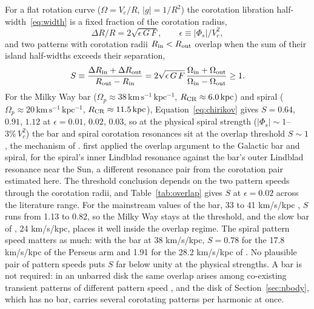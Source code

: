 \documentclass[twocolumn]{aastex701}
\newcommand{\kpc}{\,\mathrm{kpc}}
\begin{document}
For a flat rotation curve ($\Omega=V_c/R$, $|g|=1/R^2$) the corotation libration
half-width~\eqref{eq:width} is a fixed fraction of the corotation radius,
%
\begin{equation}
  \Delta R / R = 2\sqrt{\epsilon\,G\,F},
  \qquad \epsilon \equiv |\Phi_s|/V_c^2 ,
\end{equation}
%
and two patterns with corotation radii $R_{\rm in}<R_{\rm out}$ overlap when the sum
of their island half-widths exceeds their separation,
%
\begin{equation}
  S \equiv \frac{\Delta R_{\rm in}+\Delta R_{\rm out}}{R_{\rm out}-R_{\rm in}}
  = 2\sqrt{\epsilon\,G\,F}\,\frac{\Omega_{\rm in}+\Omega_{\rm out}}
                                  {\Omega_{\rm in}-\Omega_{\rm out}} \ge 1 .
  \label{eq:chirikov}
\end{equation}
%
For the Milky Way bar ($\Omega_p\approx38\,\mathrm{km\,s^{-1}\,kpc^{-1}}$,
$R_{\rm CR}\approx6.0\kpc$) and spiral
($\Omega_p\approx20\,\mathrm{km\,s^{-1}\,kpc^{-1}}$, $R_{\rm CR}\approx11.5\kpc$),
Equation~\eqref{eq:chirikov} gives $S=0.64$, $0.91$, $1.12$ at $\epsilon=0.01$,
$0.02$, $0.03$, so at the physical spiral strength ($|\Phi_s|\sim1$--$3\%\,V_c^2$)
the bar and spiral corotation resonances sit at the overlap threshold $S\sim1$, the
mechanism of \citet{Minchev2010}. \citet{Quillen2003} first applied the overlap
argument to the Galactic bar and spiral, for the spiral's inner Lindblad resonance
against the bar's outer Lindblad resonance near the Sun, a different resonance pair
from the corotation pair estimated here. The threshold conclusion depends on the two
pattern speeds through the corotation radii, and Table~\ref{tab:overlap} gives $S$ at
$\epsilon=0.02$ across the literature range. For the mainstream values of the bar, 33
to 41 km/s/kpc \citep{ClarkeGerhard2022,Binney2020,Portail2017,Sanders2019,Bovy2019},
$S$ runs from 1.13 to 0.82, so the Milky Way stays at the threshold, and the slow bar of
\citet{Horta2025}, 24 km/s/kpc, places it well inside the overlap regime. The spiral
pattern speed matters as much: with the bar at 38 km/s/kpc, $S=0.78$ for the 17.8
km/s/kpc of the Perseus arm \citep{CastroGinard2021} and 1.91 for the 28.2 km/s/kpc of
\citet{Dias2019}. No plausible pair of pattern speeds puts $S$ far below unity at the
physical strengths. A bar is not required: in an unbarred disk the same overlap arises
among co-existing transient patterns of different pattern speed
\citep{SellwoodCarlberg2014}, and the disk of Section~\ref{sec:nbody}, which has no bar,
carries several corotating patterns per harmonic at once.
\end{document}
